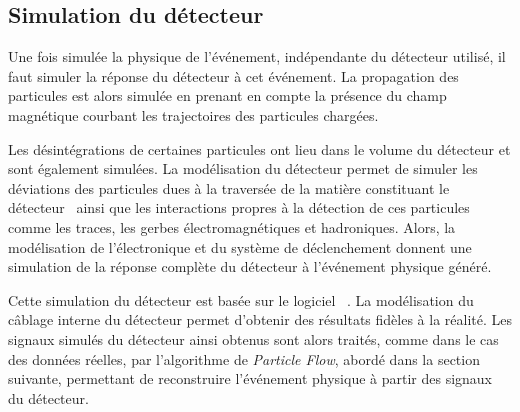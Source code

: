 \subsection{Simulation du détecteur}\label{chapter-LHC-section-MC-subsec-detector_sim}
Une fois simulée la physique de l'événement, indépendante du détecteur utilisé, il faut simuler la réponse du détecteur à cet événement.
La propagation des particules est alors simulée en prenant en compte la présence du champ magnétique courbant les trajectoires des particules chargées.
\par Les désintégrations de certaines particules ont lieu dans le volume du détecteur et sont également simulées.
La modélisation du détecteur permet de simuler les déviations des particules dues à la traversée de la matière constituant le détecteur~\cite{moliere_scat_1,moliere_scat_2} ainsi que les interactions propres à la détection de ces particules comme les traces, les gerbes électromagnétiques et hadroniques.
Alors, la modélisation de l'électronique et du système de déclenchement donnent une simulation de la réponse complète du détecteur à l'événement physique généré.
\par Cette simulation du détecteur est basée sur le logiciel
\GEANTfour~\cite{geant4}.
La modélisation du câblage interne du détecteur permet d'obtenir des résultats fidèles à la réalité.
Les signaux simulés du détecteur ainsi obtenus sont alors traités, comme dans le cas des données réelles, par l'algorithme de \emph{Particle Flow}, abordé dans la section suivante, permettant de reconstruire l'événement physique à partir des signaux du détecteur.
